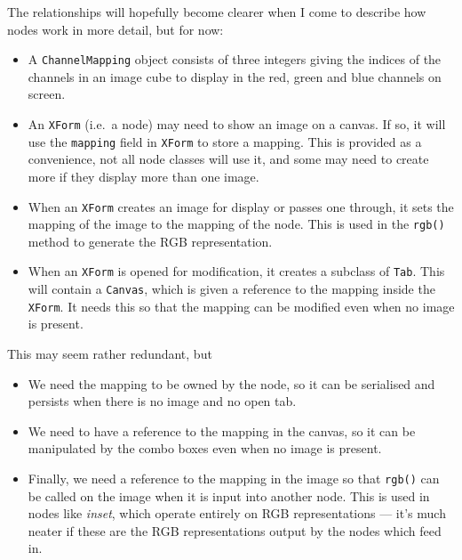 The relationships will hopefully become clearer when I come to describe how nodes work in more
detail, but for now:
\begin{itemize}
\item A \texttt{ChannelMapping} object consists of three integers giving the indices of 
the channels in an image cube to display in the red, green and blue channels on screen.
\item An \texttt{XForm} (i.e.\ a node) may need to show an image on a canvas. If so, it 
will use the \texttt{mapping} field in \texttt{XForm} to store a mapping. This is provided
as a convenience, not all node classes will use it, and some may need to create more if they 
display more than one image.
\item When an \texttt{XForm} creates an image for display or passes
one through, it sets the mapping of the image to the mapping of the node. This is used in the
\texttt{rgb()} method to generate the RGB representation.
\item When an \texttt{XForm} is opened for modification, it creates a subclass of \texttt{Tab}.
This will contain a \texttt{Canvas}, which is given a reference to the mapping inside the
\texttt{XForm}. It needs this so that the mapping can be modified even when no image is present.
\end{itemize}
This may seem rather redundant, but
\begin{itemize}
\item We need the mapping to be owned by the node, so it can be serialised and persists when
there is no image and no open tab.
\item We need to have a reference to the mapping in the canvas, so it can be manipulated by
the combo boxes even when no image is present.
\item Finally, we need a reference to the mapping in the image so that \texttt{rgb()} can be called
on the image when it is input into another node. This is used in nodes like \emph{inset}, which
operate entirely on RGB representations --- it's much neater if these are the RGB representations
output by the nodes which feed in.
\end{itemize}




